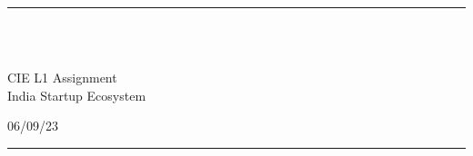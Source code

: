 \fancyhead[C]{}
\hrule \medskip
\begin{minipage}{0.295\textwidth} 
\raggedright
\footnotesize
\yourname \hfill\\ 
\yoursrn \hfill\\ 
\coursecode
\end{minipage}
\begin{minipage}{0.4\textwidth} 
\centering 
\large 
CIE L1 Assignment \assignmentnumber\\ 
\normalsize 
India Startup Ecosystem\\ 
\end{minipage}
\begin{minipage}{0.295\textwidth} 
\raggedleft
\hfill{06/09/23}
\end{minipage}
\medskip\hrule 
\bigskip
